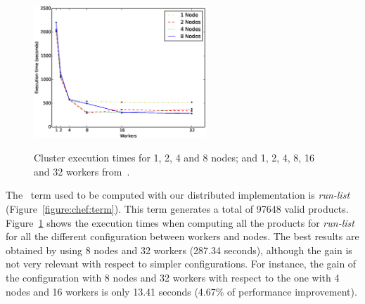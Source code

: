 \begin{figure}[t]
	\centering
	\linefigure
	\\
	\includegraphics[width=0.7\hsize, height=5cm,angle=0]{plot_cluster.eps}
	\linefigure
	\caption{Cluster execution times for 1, 2, 4 and 8 nodes; and 1, 2, 4, 8, 16 and 32 workers  from~\cite{clc16}.}\label{fig:cluster}
\end{figure}

The \fodaPA\ term used to be computed with our distributed
implementation is \textit{run-list} (Figure~\ref{figure:chef:term}). 
This term generates a total of 97648 valid products. 
Figure~\ref{fig:cluster} shows the execution times when computing all
the products for \textit{run-list} for all the
different configuration between workers and nodes.   The best results are
obtained
by using  8 nodes and 32 workers (287.34 seconds), although the gain is not very
relevant with respect to simpler configurations. For instance, 
the gain of the configuration with 8 nodes and 32 workers with
respect to the one
with 4 nodes and 16 workers is only 13.41 seconds (4.67\% of
performance improvement). 





















